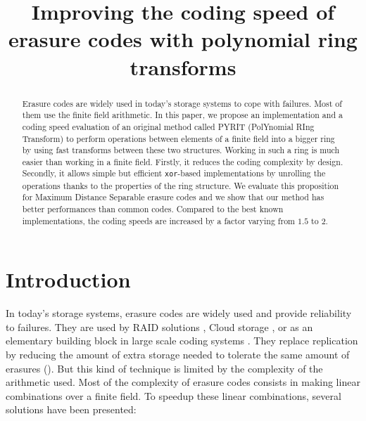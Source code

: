 \documentclass[conference]{IEEEtran}
\begin{document}
\title{Improving the coding speed of erasure codes with polynomial ring transforms}

\author{
} %

\maketitle

\begin{abstract}
Erasure codes are widely used in today's storage systems to cope with failures. Most of them use the finite field arithmetic. In this paper, we propose an implementation and a coding speed evaluation of an original method called PYRIT (PolYnomial RIng Transform) to perform operations between elements of a finite field into a bigger ring by using fast transforms between these two structures. Working in such a ring is much easier than working in a finite field. Firstly, it reduces the coding complexity by design. Secondly, it allows simple but efficient \texttt{xor}-based implementations by unrolling the operations thanks to the properties of the ring structure. We evaluate this proposition for Maximum Distance Separable erasure codes and we show that our method has better performances than common codes. Compared to the best known implementations, the coding speeds are increased by a factor varying from $1.5$ to $2$.
\end{abstract}

\section{Introduction}
\label{sec:intro}
In today's storage systems, erasure codes are widely used and provide reliability to failures. They are used by RAID solutions \cite{Anvin:2009}, Cloud storage \cite{Huang:2012:ECW:2342821.2342823}, or as an elementary building block in large scale coding systems \cite{xorbas}. They replace replication by reducing the amount of extra storage needed to tolerate the same amount of erasures (\cite{Weatherspoon2002}). 
But this kind of technique is limited by the complexity of the arithmetic used. Most of the complexity of erasure codes consists in making linear combinations over a finite field. To speedup these linear combinations, several solutions have been presented:
\end{document}
